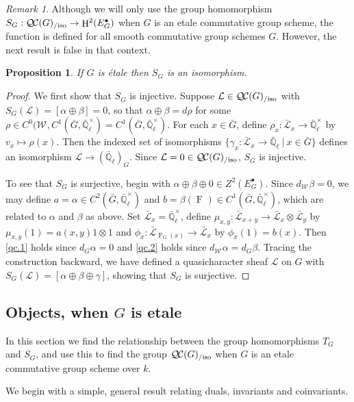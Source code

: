 \documentclass{amsart}
\theoremstyle{plain}
\newtheorem{proposition}[theorem]{Proposition}
\theoremstyle{definition}
\theoremstyle{remark}
\newtheorem{remark}[theorem]{Remark}
\newcommand{\EE}{\mathbb{\bar Q}_\ell}
\newcommand{\Fq}{k}
\newcommand{\EEx}{\EE^\times}
\newcommand{\Weil}[1]{\mathcal{W}_{#1}}
\newcommand{\Frob}[1]{\operatorname{F}_{#1}}
\DeclareMathOperator{\Hh}{H}
\newcommand{\tq}{{\ \vert\ }}
\newcommand{\qcs}[1]{{\mathcal{#1}}}
\newcommand{\gqcs}[1]{{\mathcal{\bar #1}}}
\newcommand{\QC}{{\mathcal{Q\hskip-0.8pt C}}}
\newcommand{\QCiso}[1]{\QC(#1)_{/\text{iso}}}
\newcommand{\TrFrob}[1]{T_{#1}}
\begin{document}
\begin{remark}
Although we will only use the group homomorphism $S_G : \QCiso{G}\to \Hh^2(E^\bullet_G)$ when $G$ is an etale commutative group scheme, the function is defined for all smooth commutative group schemes $G$.
However, the next result is false in that context.
\end{remark}

\begin{proposition}
If $G$ is \'etale then $S_G$ is an isomorphism.
\end{proposition}
\begin{proof}
We first show that $S_G$ is injective.  Suppose $\qcs{L} \in \QCiso{G}$ with $S_G(\qcs{L}) = [\alpha \oplus \beta] = 0$,
so that $\alpha \oplus \beta = d\rho$ for some $\rho \in C^0(\Weil{},C^1({\bar G},\EEx) = C^1({\bar G},\EEx)$.
For each $x\in {\bar G}$, define $\rho_x : \gqcs{L}_x \to \EEx$ by $v_x \mapsto \rho(x)$.
Then the indexed set of isomorphisms $\{ \gamma_x : \gqcs{L}_x \to \EE \tq x\in {\bar G}\}$
defines an isomorphism $\qcs{L} \to (\EE)_G$.
Since $\qcs{L} = 0 \in \QCiso{G}$, $S_G$ is injective.

To see that $S_G$ is surjective, begin with $\alpha\oplus\beta\oplus 0 \in Z^2(E^\bullet_G)$.
Since $d_{\Weil{}} \beta = 0$, we may define $a = \alpha \in C^2({\bar G},\EEx)$ and
$b = \beta(\Frob{}) \in C^1({\bar G},\EEx)$, which are related to $\alpha$ and $\beta$ as above.
Set $\gqcs{L}_x = \EEx$, define $\mu_{x,y} : \gqcs{L}_{x+y} \to \gqcs{L}_x\otimes\gqcs{L}_y$
by $\mu_{x,y}(1) = a(x,y) 1\otimes 1$ and $\phi_x : \gqcs{L}_{\Frob{G}(x)} \to \gqcs{L}_x$ by $\phi_x(1)= b(x)$.
Then \ref{qc.1} holds since $d_G \alpha =0$ and \ref{qc.2} holds since $d_{\Weil{}}\alpha =d_G \beta$.
Tracing the construction backward, we have defined a quasicharacter sheaf $\qcs{L}$ on $G$ with
$S_G(\qcs{L}) = [\alpha\oplus\beta\oplus\gamma]$, showing that $S_G$ is surjective.
\end{proof}

\subsection{Objects, when $G$ is etale}%

In this section we find the relationship between the group homomorphisms $\TrFrob{G}$ and $S_G$, and use this to find the group $\QCiso{G}$ when $G$ is an etale commutative group scheme over $\Fq$.

%
We begin with a simple, general result relating duals, invariants and coinvariants.
\end{document}
